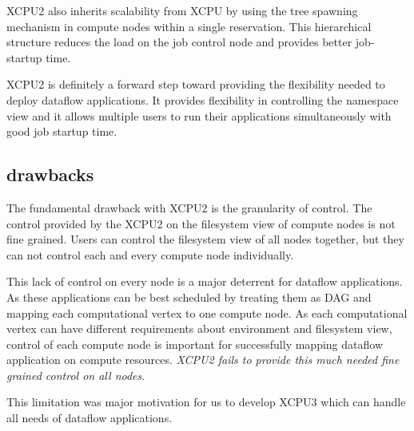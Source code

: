 XCPU2 also inherits scalability from XCPU by using the tree spawning mechanism in compute
nodes within a single reservation.  This hierarchical structure reduces the load
on the job control node and provides better job-startup time. 

XCPU2 is definitely a forward step toward providing the flexibility needed to deploy
dataflow applications.  It provides flexibility in controlling the namespace view 
and it allows multiple users to run their applications simultaneously with good
job startup time.

\subsection{drawbacks}

The fundamental drawback with XCPU2 is the granularity of control.
The control provided by the XCPU2 on the filesystem view of compute nodes is not fine
grained.  Users can control the filesystem view of all nodes together, but they
can not control each and every compute node individually.

This lack of control on every node is a major deterrent for dataflow applications.
As these applications can be best scheduled by treating them as DAG and mapping
each computational vertex to one compute node.  As each computational vertex can
have different requirements about environment and filesystem view, control of
each compute node is important for successfully mapping dataflow application
on compute resources.  \textit{XCPU2 fails to provide this much needed fine grained control
on all nodes}.

This limitation was major motivation for us to develop XCPU3 which can handle
all needs of dataflow applications.

